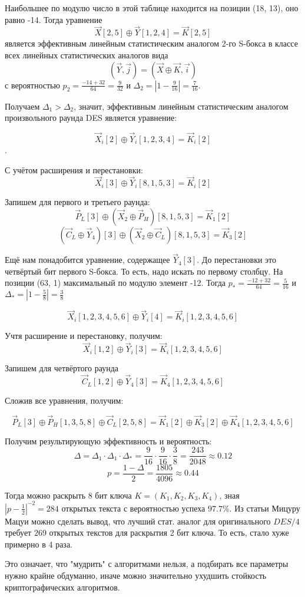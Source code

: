 \medskip

Наибольшее по модулю число в этой таблице находится на позиции (18, 13), оно равно -14. Тогда уравнение
$$\vec{X}[2, 5] \oplus \vec{Y}[1, 2, 4] = \vec{K}[2, 5]$$
является эффективным линейным статистическим аналогом 2-го S-бокса в классе всех линейных статистических аналогов вида
$$(\vec{Y}, \vec{j}) = (\vec{X} \oplus \vec{K}, \vec{i})$$
с вероятностью $p_2 = \frac{-14 + 32}{64} = \frac{9}{32}$ и $\Delta_2 = |1 - \frac{9}{16}| = \frac{7}{16}$.

Получаем $\Delta_1 > \Delta_2$, значит, эффективным линейным статистическим аналогом произвольного раунда DES является уравнение:

$$\vec{X}_i [2] \oplus \vec{Y}_i [1, 2, 3, 4] = \vec{K}_i [2]$$.

С учётом расширения и перестановки:
$$\vec{X}_i [3] \oplus \vec{Y}_i [8, 1, 5, 3] = \vec{K}_i [2]$$

Запишем для первого и третьего раунда:
$$\vec{P}_L [3] \oplus (\vec{X}_2 \oplus \vec{P}_H)  [8, 1, 5, 3] = \vec{K}_1 [2]$$
$$(\vec{C}_L \oplus \vec{Y}_4) [3] \oplus (\vec{X}_2 \oplus \vec{C}_L) [8, 1, 5, 3] = \vec{K}_3 [2]$$

Ещё нам понадобится уравнение, содержащее $\vec{Y}_4[3]$. До перестановки это четвёртый бит первого S-бокса. То есть, надо искать по первому столбцу. На позиции (63, 1) максимальный по модулю элемент -12. Тогда $p_* = \frac{-12 + 32}{64} = \frac{5}{16}$ и $\Delta_* = |1 - \frac{5}{8}| = \frac{3}{8}$

$$\vec{X}_i [1, 2, 3, 4, 5, 6] \oplus \vec{Y}_i [4] = \vec{K}_i [1, 2, 3, 4, 5, 6]$$

Учтя расширение и перестановку, получим:
$$\vec{X}_i [1, 2] \oplus \vec{Y}_i [3] = \vec{K}_i [1, 2, 3, 4, 5, 6]$$

Запишем для четвёртого раунда
$$\vec{C}_L [1, 2] \oplus \vec{Y}_4 [3] = \vec{K}_4 [1, 2, 3, 4, 5, 6]$$

Сложив все уравнения, получим:

$$\vec{P}_L [3] \oplus \vec{P}_H [1, 3, 5, 8] \oplus \vec{C}_L [2, 5, 8]= \vec{K}_1 [2] \oplus \vec{K}_3 [2] \oplus \vec{K}_4 [1, 2, 3, 4, 5, 6]$$

Получим результирующую эффективность и вероятность:
$$\Delta = \Delta_1 \cdot \Delta_1 \cdot \Delta_* = \frac{9}{16} \cdot \frac{9}{16} \cdot \frac{3}{8} = \frac{243}{2048} \approx 0.12$$
$$p = \frac{1 - \Delta}{2} = \frac{1805}{4096} \approx 0.44 $$

Тогда можно раскрыть 8 бит ключа $K = (K_1, K_2, K_3, K_4)$, зная \\$|p - \frac{1}{2}|^{-2} = 284$ открытых текста с вероятностью успеха $97.7\%$. Из статьи Мицуру Мацуи можно сделать вывод, что лучший стат. аналог для оригинального $DES/4$ требует $269$ открытых текстов для раскрытия 2 бит ключа. То есть, стало хуже примерно в 4 раза.

Это означает, что "мудрить" с алгоритмами нельзя, а подбирать все параметры нужно крайне обдуманно, иначе можно значительно ухудшить стойкость криптографических алгоритмов.